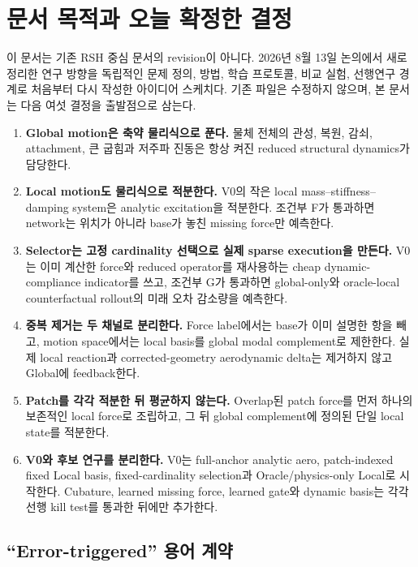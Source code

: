 \documentclass[11pt,a4paper]{article}
\begin{document}
\tableofcontents
\newpage

\section{문서 목적과 오늘 확정한 결정}

이 문서는 기존 RSH 중심 문서의 revision이 아니다.
2026년 8월 13일 논의에서 새로 정리한 연구 방향을 독립적인 문제 정의, 방법, 학습 프로토콜,
비교 실험, 선행연구 경계로 처음부터 다시 작성한 아이디어 스케치다.
기존 파일은 수정하지 않으며, 본 문서는 다음 여섯 결정을 출발점으로 삼는다.

\begin{enumerate}[leftmargin=1.7em]
  \item \textbf{Global motion은 축약 물리식으로 푼다.}
  물체 전체의 관성, 복원, 감쇠, attachment, 큰 굽힘과 저주파 진동은 항상 켜진 reduced structural dynamics가 담당한다.
  \item \textbf{Local motion도 물리식으로 적분한다.}
  V0의 작은 local mass--stiffness--damping system은 analytic excitation을 적분한다.
  조건부 F가 통과하면 network는 위치가 아니라 base가 놓친 missing force만 예측한다.
  \item \textbf{Selector는 고정 cardinality 선택으로 실제 sparse execution을 만든다.}
  V0는 이미 계산한 force와 reduced operator를 재사용하는 cheap dynamic-compliance indicator를 쓰고,
  조건부 G가 통과하면
  global-only와 oracle-local counterfactual rollout의 미래 오차 감소량을 예측한다.
  \item \textbf{중복 제거는 두 채널로 분리한다.}
  Force label에서는 base가 이미 설명한 항을 빼고,
  motion space에서는 local basis를 global modal complement로 제한한다.
  실제 local reaction과 corrected-geometry aerodynamic delta는 제거하지 않고 Global에 feedback한다.
  \item \textbf{Patch를 각각 적분한 뒤 평균하지 않는다.}
  Overlap된 patch force를 먼저 하나의 보존적인 local force로 조립하고,
  그 뒤 global complement에 정의된 단일 local state를 적분한다.
  \item \textbf{V0와 후보 연구를 분리한다.}
  V0는 full-anchor analytic aero, patch-indexed fixed Local basis,
  fixed-cardinality selection과 Oracle/physics-only Local로 시작한다.
  Cubature, learned missing force, learned gate와 dynamic basis는 각각 선행 kill test를 통과한 뒤에만 추가한다.
\end{enumerate}

\subsection{``Error-triggered'' 용어 계약}
\end{document}
